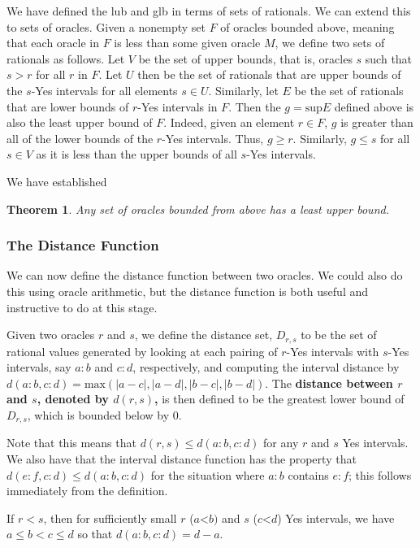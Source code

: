 \documentclass[12pt]{article}
\newtheorem{theorem}{Theorem}
\theoremstyle{remark}
\newcommand{\lt}{\mathord{<}}
\begin{document}
We have defined the lub and glb in terms of sets of rationals. We can extend this to sets of oracles. Given a nonempty set $F$ of oracles bounded above, meaning that each oracle in $F$ is less than some given oracle $M$, we define two sets of rationals as follows. Let $V$ be the set of upper bounds, that is, oracles $s$ such that $s > r$ for all $r$ in $F$. Let $U$ then be the set of rationals that are upper bounds of the $s$-Yes intervals for all elements $s \in U$. Similarly, let $E$ be the set of rationals that are lower bounds of $r$-Yes intervals in $F$. Then the $g = \mathrm{sup} E$ defined above is also the least upper bound of $F$.  Indeed, given an element $r \in F$, $g$ is greater than all of the lower bounds of the $r$-Yes intervals. Thus, $g \geq r$. Similarly, $g \leq s$ for all $s \in V$ as it is less than the upper bounds of all $s$-Yes intervals. 

We have established

\begin{theorem}\label{th:lub}
Any set of oracles bounded from above has a least upper bound. 
\end{theorem}


\subsubsection{The Distance Function}

We can now define the distance function between two oracles. We could also do this using oracle arithmetic, but the distance function is both useful and instructive to do at this stage. 

Given two oracles $r$ and $s$, we define the distance set, $D_{r,s}$ to be the set of rational values generated by looking at each pairing of $r$-Yes intervals with $s$-Yes intervals, say  $a:b$ and $c:d$, respectively, and computing the interval distance by $d(a:b,c:d) = \mathrm{max}(|a-c|, |a-d|,|b-c|,|b-d|)$. The \textbf{distance between $r$ and $s$, denoted by $d(r,s)$,} is then defined to be the greatest lower bound of $D_{r,s}$, which is bounded below by 0. 

Note that this means that $d(r,s) \leq d(a:b, c:d)$ for any $r$ and $s$ Yes intervals. We also have that the interval distance function has the property that $d(e:f, c:d) \leq d(a:b, c:d)$ for the situation where $a:b$ contains $e:f$; this follows immediately from the definition. 


If $r<s$, then for sufficiently small $r$ ($a\lt b)$ and $s$ ($c\lt d$) Yes intervals, we have $a\leq b<c \leq d$ so that $d(a:b,c:d) = d-a$. 
\end{document}
